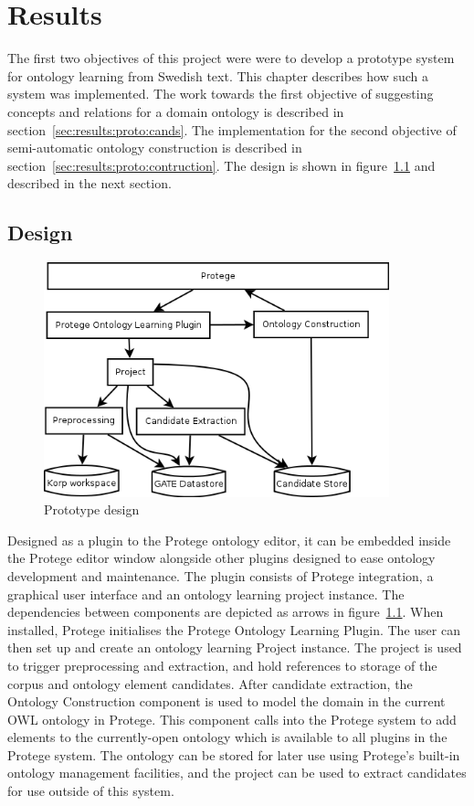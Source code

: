 \documentclass[a4paper]{report}
\begin{document}
\chapter{Results}
\label{chap:results}

The first two objectives of this project were were to develop a prototype system for ontology learning from Swedish text.
This chapter describes how such a system was implemented.
The work towards the first objective of suggesting concepts and relations for a domain ontology is described in section~\ref{sec:results:proto:cands}.
The implementation for the second objective of semi-automatic ontology construction is described in section~\ref{sec:results:proto:contruction}.
The design is shown in figure~\ref{fig:prototype-design} and described in the next section.

\section{Design}

\begin{figure}[H]
  \includegraphics[width=10cm]{graphics/protege-plugin-components-simple.png}
  \caption{Prototype design}
  \label{fig:prototype-design}
\end{figure}

Designed as a plugin to the Protege ontology editor, it can be embedded inside the Protege editor window alongside other plugins designed to ease ontology development and maintenance.
The plugin consists of Protege integration, a graphical user interface and an ontology learning project instance.
The dependencies between components are depicted as arrows in figure~\ref{fig:prototype-design}.
When installed, Protege initialises the Protege Ontology Learning Plugin.
The user can then set up and create an ontology learning Project instance.
The project is used to trigger preprocessing and extraction, and hold references to storage of the corpus and ontology element candidates.
After candidate extraction, the Ontology Construction component is used to model the domain in the current OWL ontology in Protege.
This component calls into the Protege system to add elements to the currently-open ontology which is available to all plugins in the Protege system.
The ontology can be stored for later use using Protege's built-in ontology management facilities, and the project can be used to extract candidates for use outside of this system.
\end{document}
